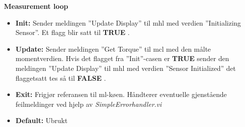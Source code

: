 \documentclass{ol-softwaremanual}
\newcommand{\true}{\textbf{TRUE} }
\newcommand{\false}{\textbf{FALSE} }
\begin{document}
\textbf{Measurement loop}
\begin{itemize}
    \item \textbf{Init:} Sender meldingen ''Update Display'' til \acrshort{mhl} med verdien ''Initializing Sensor''. Et  flagg blir satt til \true. 
    \item \textbf{Update:} Sender meldingen ''Get Torque'' til \acrshort{mcl} med den målte momentverdien. Hvis det  flagget fra ''Init''-casen er \true sender den meldingen ''Update Display'' til \acrshort{mhl} med verdien ''Sensor Initialized'' det  flaggetsatt tes så til \false. 
    \item \textbf{Exit:} Frigjør referansen til \acrshort{ml}-køen. Håndterer eventuelle gjenstående feilmeldinger ved hjelp av \textit{SimpleErrorhandler.vi}
    \item \textbf{Default:} Ubrukt
\end{itemize}
\end{document}

